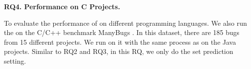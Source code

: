 {\bf RQ4. Performance on C Projects.}

To evaluate the performance of \tool on different programming languages. We also run the \tool on the C/C++ benchmark ManyBugs \cite{manybugs}. In this dataset, there are 185 bugs from 15 different projects. We run \tool on it with the same process as on the Java projects. Similar to RQ2 and RQ3, in this RQ, we only do the set prediction setting.
